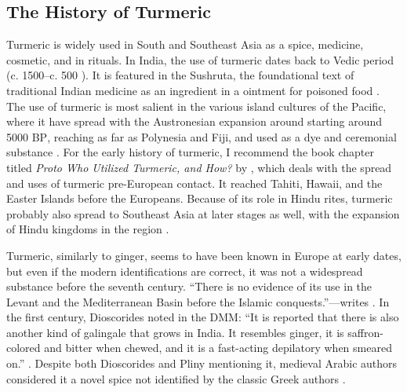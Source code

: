 

\subsection{The History of Turmeric}

Turmeric is widely used in South and Southeast Asia as a spice, medicine, cosmetic, and in rituals. In India, the use of turmeric dates back to Vedic period (c. 1500--c. 500 \BC{}). It is featured in the \gls{Sushruta}, the foundational text of traditional Indian medicine as an ingredient in a ointment for poisoned food \autocite{prasad_turmeric_2011}. The use of turmeric is most salient in the various island cultures of the Pacific, where it have spread with the Austronesian expansion around starting around 5000 \textsc{BP}, reaching as far as Polynesia and Fiji, and used as a dye and ceremonial substance \autocite{mcclatchey_traditional_1993,sopher_indigenous_1964,prance_cultural_2005}. For the early history of turmeric, I recommend the book chapter titled \textit{Proto Who Utilized Turmeric, and How?} by \textcite{kikusawa_proto_2007}, which deals with the spread and uses of turmeric pre-European contact. It reached Tahiti, Hawaii, and the Easter Islands before the Europeans. Because of its role in Hindu rites, turmeric probably also spread to Southeast Asia at later stages as well, with the expansion of Hindu kingdoms in the region \autocite[170]{prance_cultural_2005}.

Turmeric, similarly to ginger, seems to have been known in Europe at early dates, but even if the modern identifications are correct, it was not a widespread substance before the seventh century. ``There is no evidence of its use in the Levant and the Mediterranean Basin before the Islamic conquests.''---writes \textcite[108]{amar_arabian_2017}. In the first century, Dioscorides noted in the \gls{DMM}: ``It is reported that there is also another kind of galingale that grows in India. It resembles ginger, it is saffron-colored and bitter when chewed, and it is a fast-acting depilatory when smeared on.'' \autocite{dioscorides_materia_2005}. Despite both Dioscorides and Pliny mentioning it, medieval Arabic authors considered it a novel spice not identified by the classic Greek authors \autocite[108]{amar_arabian_2017}. 

